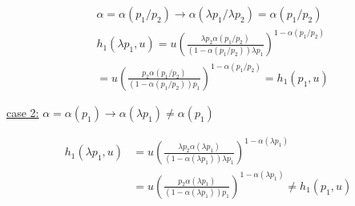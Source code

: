 {\begin{enumerate}[label=(\alph*)]
{$$
\begin{aligned}
& \alpha=\alpha\left(p_{1} / p_{2}\right) \longrightarrow \alpha\left(\lambda p_{1} / \lambda p_{2}\right)=\alpha\left(p_{1} / p_{2}\right) \\
& h_{1}\left(\lambda p_{1}, u\right)=u\left(\frac{\lambda p_{2} \alpha\left(p_{1} / p_{2}\right)}{\left(1-\alpha\left(p_{1} / p_{2}\right)\right) \lambda p_{1}}\right)^{1-\alpha\left(p_{1} / p_{2}\right)} \\
&=u\left(\frac{p_{2} \alpha\left(p_{1} / p_{2}\right)}{\left(1-\alpha\left(p_{1} / p_{2}\right)\right) p_{1}}\right)^{1-\alpha\left(p_{1} / p_{2}\right)}=h_{1}\left(p_{1},  u\right)
\end{aligned}
$$

\underline{case 2:}
 $\alpha=\alpha\left(p_{1}\right) \longrightarrow \alpha\left(\lambda p_{1}\right) \neq \alpha\left(p_{1}\right)$

$$
\begin{aligned}
h_{1}\left(\lambda p_{1}, u\right) & =u\left(\frac{\lambda p_{2} \alpha\left(\lambda p_{1}\right)}{\left(1-\alpha\left(\lambda p_{1}\right)\right) \lambda p_{1}}\right)^{1-\alpha\left(\lambda p_{1}\right)} \\
& =u\left(\frac{p_{2} \alpha\left(\lambda p_{1}\right)}{\left(1-\alpha\left(\lambda p_{1}\right)\right) p_{1}}\right)^{1-\alpha\left(\lambda p_{1}\right)} \neq h_{1}\left(p_{1}, u\right)
\end{aligned}
$$
}
\end{enumerate}
}
